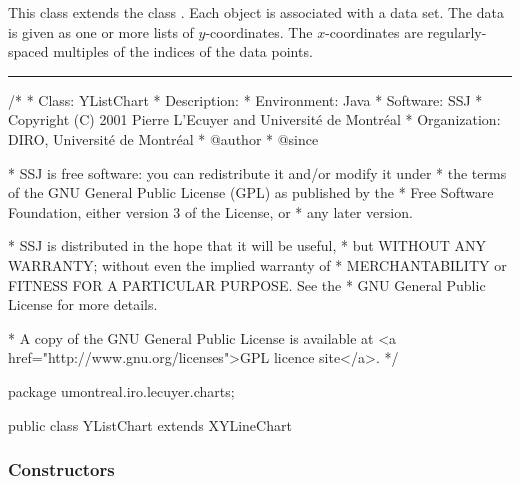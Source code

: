 

This class extends the class
.
Each  object is associated with a
 data set.
The data is given as one or more lists of $y$-coordinates.
The $x$-coordinates are
regularly-spaced multiples of the indices of the data points.


\bigskip\hrule
\begin{code}
\begin{hide}
/*
 * Class:        YListChart
 * Description:  
 * Environment:  Java
 * Software:     SSJ 
 * Copyright (C) 2001  Pierre L'Ecuyer and Université de Montréal
 * Organization: DIRO, Université de Montréal
 * @author       
 * @since

 * SSJ is free software: you can redistribute it and/or modify it under
 * the terms of the GNU General Public License (GPL) as published by the
 * Free Software Foundation, either version 3 of the License, or
 * any later version.

 * SSJ is distributed in the hope that it will be useful,
 * but WITHOUT ANY WARRANTY; without even the implied warranty of
 * MERCHANTABILITY or FITNESS FOR A PARTICULAR PURPOSE.  See the
 * GNU General Public License for more details.

 * A copy of the GNU General Public License is available at
   <a href="http://www.gnu.org/licenses">GPL licence site</a>.
 */
\end{hide}
package umontreal.iro.lecuyer.charts;

public class YListChart extends XYLineChart \begin{hide} {

\end{hide}
\end{code}

\subsubsection*{Constructors}

